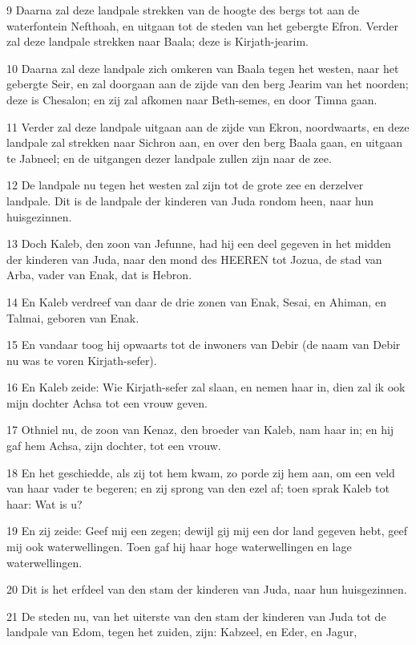 \par 9 Daarna zal deze landpale strekken van de hoogte des bergs tot aan de waterfontein Nefthoah, en uitgaan tot de steden van het gebergte Efron. Verder zal deze landpale strekken naar Baala; deze is Kirjath-jearim.
\par 10 Daarna zal deze landpale zich omkeren van Baala tegen het westen, naar het gebergte Seir, en zal doorgaan aan de zijde van den berg Jearim van het noorden; deze is Chesalon; en zij zal afkomen naar Beth-semes, en door Timna gaan.
\par 11 Verder zal deze landpale uitgaan aan de zijde van Ekron, noordwaarts, en deze landpale zal strekken naar Sichron aan, en over den berg Baala gaan, en uitgaan te Jabneel; en de uitgangen dezer landpale zullen zijn naar de zee.
\par 12 De landpale nu tegen het westen zal zijn tot de grote zee en derzelver landpale. Dit is de landpale der kinderen van Juda rondom heen, naar hun huisgezinnen.
\par 13 Doch Kaleb, den zoon van Jefunne, had hij een deel gegeven in het midden der kinderen van Juda, naar den mond des HEEREN tot Jozua, de stad van Arba, vader van Enak, dat is Hebron.
\par 14 En Kaleb verdreef van daar de drie zonen van Enak, Sesai, en Ahiman, en Talmai, geboren van Enak.
\par 15 En vandaar toog hij opwaarts tot de inwoners van Debir (de naam van Debir nu was te voren Kirjath-sefer).
\par 16 En Kaleb zeide: Wie Kirjath-sefer zal slaan, en nemen haar in, dien zal ik ook mijn dochter Achsa tot een vrouw geven.
\par 17 Othniel nu, de zoon van Kenaz, den broeder van Kaleb, nam haar in; en hij gaf hem Achsa, zijn dochter, tot een vrouw.
\par 18 En het geschiedde, als zij tot hem kwam, zo porde zij hem aan, om een veld van haar vader te begeren; en zij sprong van den ezel af; toen sprak Kaleb tot haar: Wat is u?
\par 19 En zij zeide: Geef mij een zegen; dewijl gij mij een dor land gegeven hebt, geef mij ook waterwellingen. Toen gaf hij haar hoge waterwellingen en lage waterwellingen.
\par 20 Dit is het erfdeel van den stam der kinderen van Juda, naar hun huisgezinnen.
\par 21 De steden nu, van het uiterste van den stam der kinderen van Juda tot de landpale van Edom, tegen het zuiden, zijn: Kabzeel, en Eder, en Jagur,
